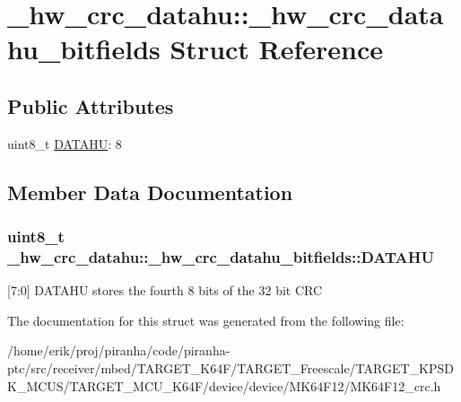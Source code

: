 \hypertarget{struct__hw__crc__datahu_1_1__hw__crc__datahu__bitfields}{}\section{\+\_\+hw\+\_\+crc\+\_\+datahu\+:\+:\+\_\+hw\+\_\+crc\+\_\+datahu\+\_\+bitfields Struct Reference}
\label{struct__hw__crc__datahu_1_1__hw__crc__datahu__bitfields}
\subsection*{Public Attributes}
\begin{DoxyCompactItemize}
\item 
uint8\+\_\+t \hyperlink{struct__hw__crc__datahu_1_1__hw__crc__datahu__bitfields_a5fe3d06b75989deb88f784d190a1cfa5}{D\+A\+T\+A\+HU}\+: 8
\end{DoxyCompactItemize}


\subsection{Member Data Documentation}
\subsubsection[{\texorpdfstring{D\+A\+T\+A\+HU}{DATAHU}}]{\setlength{\rightskip}{0pt plus 5cm}uint8\+\_\+t \+\_\+hw\+\_\+crc\+\_\+datahu\+::\+\_\+hw\+\_\+crc\+\_\+datahu\+\_\+bitfields\+::\+D\+A\+T\+A\+HU}\hypertarget{struct__hw__crc__datahu_1_1__hw__crc__datahu__bitfields_a5fe3d06b75989deb88f784d190a1cfa5}{}\label{struct__hw__crc__datahu_1_1__hw__crc__datahu__bitfields_a5fe3d06b75989deb88f784d190a1cfa5}
\mbox{[}7\+:0\mbox{]} D\+A\+T\+A\+HU stores the fourth 8 bits of the 32 bit C\+RC 

The documentation for this struct was generated from the following file\+:\begin{DoxyCompactItemize}
\item 
/home/erik/proj/piranha/code/piranha-\/ptc/src/receiver/mbed/\+T\+A\+R\+G\+E\+T\+\_\+\+K64\+F/\+T\+A\+R\+G\+E\+T\+\_\+\+Freescale/\+T\+A\+R\+G\+E\+T\+\_\+\+K\+P\+S\+D\+K\+\_\+\+M\+C\+U\+S/\+T\+A\+R\+G\+E\+T\+\_\+\+M\+C\+U\+\_\+\+K64\+F/device/device/\+M\+K64\+F12/M\+K64\+F12\+\_\+crc.\+h\end{DoxyCompactItemize}
